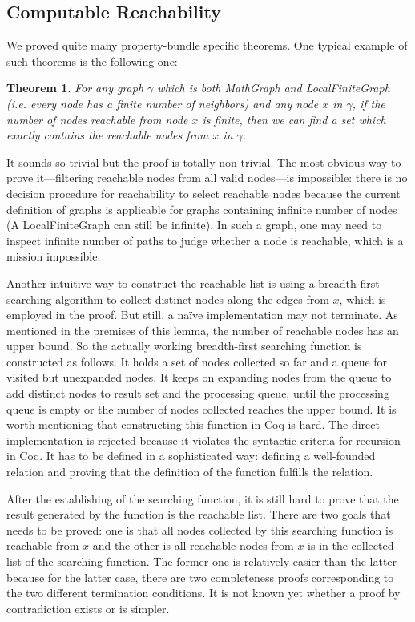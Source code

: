 \subsection{Computable Reachability}
We proved quite many property-bundle specific theorems. One typical
example of such theorems is the following one:
\newtheorem{mythm}{Theorem}
\begin{mythm}
For any graph $\gamma$ which is both MathGraph and LocalFiniteGraph
(i.e. every node has a finite number of neighbors) and any node $x$ in
$\gamma$, if the number of nodes reachable from node $x$ is finite,
then we can find a set which exactly contains the reachable nodes from
$x$ in $\gamma$.
\end{mythm}
It sounds so trivial but the proof is totally non-trivial. The most
obvious way to prove it---filtering reachable nodes from all valid
nodes---is impossible: there is no decision procedure for reachability
to select reachable nodes because the current definition of graphs is
applicable for graphs containing infinite number of nodes (A
LocalFiniteGraph can still be infinite). In such a graph, one may need
to inspect infinite number of paths to judge whether a node is
reachable, which is a mission impossible.

Another intuitive way to construct the reachable list is using a
breadth-first searching algorithm to collect distinct nodes along the
edges from $x$, which is employed in the proof. But still, a na\"ive
implementation may not terminate. As mentioned in the premises of this
lemma, the number of reachable nodes has an upper bound. So the
actually working breadth-first searching function is constructed as
follows. It holds a set of nodes collected so far and a queue for
visited but unexpanded nodes. It keeps on expanding nodes from the
queue to add distinct nodes to result set and the processing queue,
until the processing queue is empty or the number of nodes collected
reaches the upper bound. It is worth mentioning that constructing this
function in Coq is hard. The direct implementation is rejected because
it violates the syntactic criteria for recursion in Coq. It has to be
defined in a sophisticated way: defining a well-founded relation and
proving that the definition of the function fulfills the relation.

After the establishing of the searching function, it is still hard to
prove that the result generated by the function is the reachable
list. There are two goals that needs to be proved: one is that all
nodes collected by this searching function is reachable from $x$ and
the other is all reachable nodes from $x$ is in the
collected list of the searching function. The former one is relatively
easier than the latter because for the latter case, there are two
completeness proofs corresponding to the two different termination
conditions. It is not known yet whether a proof by contradiction
exists or is simpler.

